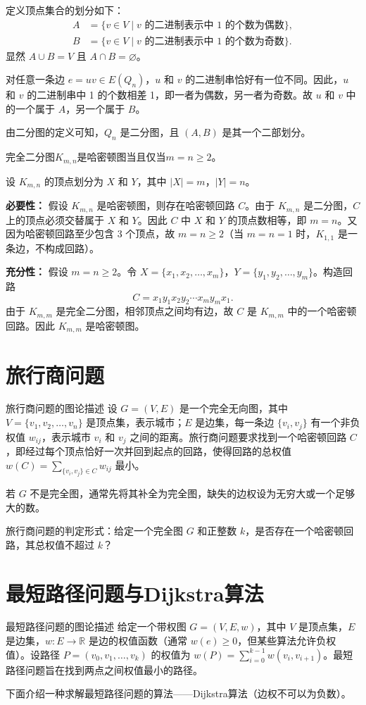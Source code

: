 \documentclass[lang=cn,11pt]{elegantbook}
\begin{document}
    定义顶点集合的划分如下：
    \begin{align*}
    A &= \{ v \in V \mid v \text{ 的二进制表示中 1 的个数为偶数} \}, \\
    B &= \{ v \in V \mid v \text{ 的二进制表示中 1 的个数为奇数} \}.
    \end{align*}
    显然 $A \cup B = V$ 且 $A \cap B = \varnothing$。

    对任意一条边 $e = uv \in E(Q_n)$，$u$ 和 $v$ 的二进制串恰好有一位不同。因此，$u$ 和 $v$ 的二进制串中 1 的个数相差 1，即一者为偶数，另一者为奇数。故 $u$ 和 $v$ 中的一个属于 $A$，另一个属于 $B$。

    由二分图的定义可知，$Q_n$ 是二分图，且 $(A, B)$ 是其一个二部划分。
\begin{theorem}
    完全二分图$K_{m,n}$是哈密顿图当且仅当$m=n\geqslant 2$。
\end{theorem}
设 $K_{m,n}$ 的顶点划分为 $X$ 和 $Y$，其中 $|X| = m$，$|Y| = n$。

    \textbf{必要性：} 假设 $K_{m,n}$ 是哈密顿图，则存在哈密顿回路 $C$。由于 $K_{m,n}$ 是二分图，$C$ 上的顶点必须交替属于 $X$ 和 $Y$。因此 $C$ 中 $X$ 和 $Y$ 的顶点数相等，即 $m = n$。又因为哈密顿回路至少包含 3 个顶点，故 $m = n \ge 2$（当 $m=n=1$ 时，$K_{1,1}$ 是一条边，不构成回路）。

    \textbf{充分性：} 假设 $m = n \ge 2$。令 $X = \{x_1, x_2, \dots, x_m\}$，$Y = \{y_1, y_2, \dots, y_m\}$。构造回路
    \[
    C = x_1 y_1 x_2 y_2 \cdots x_m y_m x_1.
    \]
    由于 $K_{m,m}$ 是完全二分图，相邻顶点之间均有边，故 $C$ 是 $K_{m,m}$ 中的一个哈密顿回路。因此 $K_{m,m}$ 是哈密顿图。
\section{旅行商问题}
\begin{definition}{旅行商问题的图论描述}
设 $G=(V,E)$ 是一个完全无向图，其中 $V=\{v_1,v_2,\ldots,v_n\}$ 是顶点集，表示城市；$E$ 是边集，每一条边 $\{v_i,v_j\}$ 有一个非负权值 $w_{ij}$，表示城市 $v_i$ 和 $v_j$ 之间的距离。旅行商问题要求找到一个哈密顿回路 $C$，即经过每个顶点恰好一次并回到起点的回路，使得回路的总权值 $\displaystyle w(C)=\sum_{\{v_i,v_j\}\in C} w_{ij}$ 最小。

若 $G$ 不是完全图，通常先将其补全为完全图，缺失的边权设为无穷大或一个足够大的数。

旅行商问题的判定形式：给定一个完全图 $G$ 和正整数 $k$，是否存在一个哈密顿回路，其总权值不超过 $k$？
\end{definition}
\section{最短路径问题与Dijkstra算法}
\begin{definition}{最短路径问题的图论描述}
    给定一个带权图 $G=(V,E,w)$，其中 $V$ 是顶点集，$E$ 是边集，$w: E \to \mathbb{R}$ 是边的权值函数（通常 $w(e) \geqslant 0$，但某些算法允许负权值）。设路径 $P = (v_0, v_1, \ldots, v_k)$ 的权值为 $w(P) =\displaystyle \sum_{i=0}^{k-1} w(v_i, v_{i+1})$。最短路径问题旨在找到两点之间权值最小的路径。
\end{definition}
下面介绍一种求解最短路径问题的算法——Dijkstra算法（边权不可以为负数）。
\end{document}
